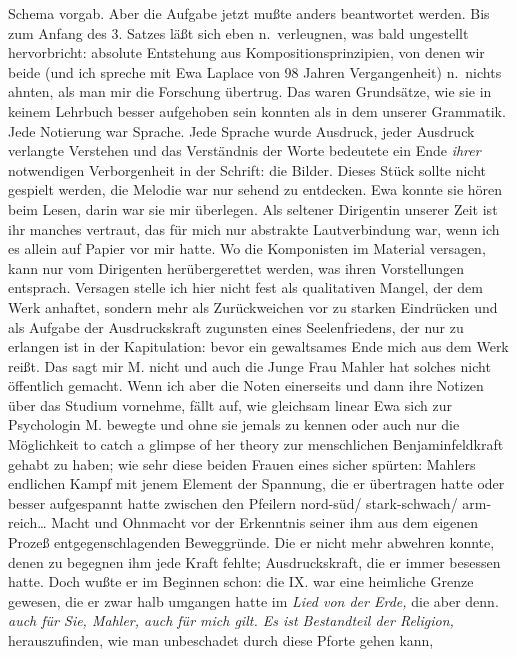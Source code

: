 \documentclass[
]{article}
\begin{document}
\begin{enumerate}
  Schema vorgab. Aber die Aufgabe jetzt mußte anders beantwortet werden.
  Bis zum Anfang des 3. Satzes läßt sich eben n.~verleugnen, was bald
  ungestellt hervorbricht: absolute Entstehung aus
  Kompositionsprinzipien, von denen wir beide (und ich spreche mit Ewa
  Laplace von 98 Jahren Vergangenheit) n.~nichts ahnten, als man mir die
  Forschung übertrug. Das waren Grundsätze, wie sie in keinem Lehrbuch
  besser aufgehoben sein konnten als in dem unserer Grammatik. Jede
  Notierung war Sprache. Jede Sprache wurde Ausdruck, jeder Ausdruck
  verlangte Verstehen und das Verständnis der Worte bedeutete ein Ende
  \emph{ihrer} notwendigen Verborgenheit in der Schrift: die Bilder.
  Dieses Stück sollte nicht gespielt werden, die Melodie war nur sehend
  zu entdecken. Ewa konnte sie hören beim Lesen, darin war sie mir
  überlegen. Als seltener Dirigentin unserer Zeit ist ihr manches
  vertraut, das für mich nur abstrakte Lautverbindung war, wenn ich es
  allein auf Papier vor mir hatte. Wo die Komponisten im Material
  versagen, kann nur vom Dirigenten herübergerettet werden, was ihren
  Vorstellungen entsprach. Versagen stelle ich hier nicht fest als
  qualitativen Mangel, der dem Werk anhaftet, sondern mehr als
  Zurückweichen vor zu starken Eindrücken und als Aufgabe der
  Ausdruckskraft zugunsten eines Seelenfriedens, der nur zu erlangen ist
  in der Kapitulation: bevor ein gewaltsames Ende mich aus dem Werk
  reißt. Das sagt mir M. nicht und auch die Junge Frau Mahler hat
  solches nicht öffentlich gemacht. Wenn ich aber die Noten einerseits
  und dann ihre Notizen über das Studium vornehme, fällt auf, wie
  gleichsam linear Ewa sich zur Psychologin M. bewegte und ohne sie
  jemals zu kennen oder auch nur die Möglichkeit to catch a glimpse of
  her theory zur menschlichen Benjaminfeldkraft gehabt zu haben; wie
  sehr diese beiden Frauen eines sicher spürten: Mahlers endlichen Kampf
  mit jenem Element der Spannung, die er übertragen hatte oder besser
  aufgespannt hatte zwischen den Pfeilern nord-süd/ stark-schwach/
  arm-reich\ldots{} Macht und Ohnmacht vor der Erkenntnis seiner ihm aus
  dem eigenen Prozeß entgegenschlagenden Beweggründe. Die er nicht mehr
  abwehren konnte, denen zu begegnen ihm jede Kraft fehlte;
  Ausdruckskraft, die er immer besessen hatte. Doch wußte er im Beginnen
  schon: die IX. war eine heimliche Grenze gewesen, die er zwar halb
  umgangen hatte im \emph{Lied von der Erde,} die aber denn. \emph{auch
  für Sie, Mahler, auch für mich gilt. Es ist Bestandteil der Religion,
  }herauszufinden, wie man unbeschadet durch diese Pforte gehen kann,

\end{enumerate}
\end{document}
